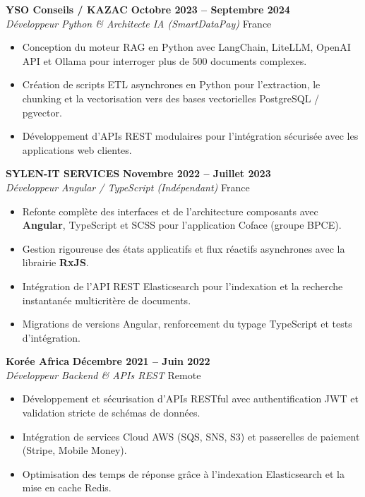 \documentclass[10pt,a4paper]{article}
\begin{document}
\vspace{0.35em}

\textbf{\large YSO Conseils / KAZAC} \hfill {\bfseries\small\color{slateGray} Octobre 2023 -- Septembre 2024} \\
\emph{\color{primary}Développeur Python \& Architecte IA (SmartDataPay)} \hfill {\small France}
\begin{itemize}[leftmargin=1.4em, itemsep=0.18em, topsep=0.15em]
    \item Conception du moteur RAG en Python avec LangChain, LiteLLM, OpenAI API et Ollama pour interroger plus de 500 documents complexes.
    \item Création de scripts ETL asynchrones en Python pour l'extraction, le chunking et la vectorisation vers des bases vectorielles PostgreSQL / pgvector.
    \item Développement d'APIs REST modulaires pour l'intégration sécurisée avec les applications web clientes.
\end{itemize}

\newpage

\textbf{\large SYLEN-IT SERVICES} \hfill {\bfseries\small\color{slateGray} Novembre 2022 -- Juillet 2023} \\
\emph{\color{primary}Développeur Angular / TypeScript (Indépendant)} \hfill {\small France}
\begin{itemize}[leftmargin=1.4em, itemsep=0.18em, topsep=0.15em]
    \item Refonte complète des interfaces et de l'architecture composants avec \textbf{Angular}, TypeScript et SCSS pour l'application Coface (groupe BPCE).
    \item Gestion rigoureuse des états applicatifs et flux réactifs asynchrones avec la librairie \textbf{RxJS}.
    \item Intégration de l'API REST Elasticsearch pour l'indexation et la recherche instantanée multicritère de documents.
    \item Migrations de versions Angular, renforcement du typage TypeScript et tests d'intégration.
\end{itemize}

\vspace{0.35em}

\textbf{\large Korée Africa} \hfill {\bfseries\small\color{slateGray} Décembre 2021 -- Juin 2022} \\
\emph{\color{primary}Développeur Backend \& APIs REST} \hfill {\small Remote}
\begin{itemize}[leftmargin=1.4em, itemsep=0.18em, topsep=0.15em]
    \item Développement et sécurisation d'APIs RESTful avec authentification JWT et validation stricte de schémas de données.
    \item Intégration de services Cloud AWS (SQS, SNS, S3) et passerelles de paiement (Stripe, Mobile Money).
    \item Optimisation des temps de réponse grâce à l'indexation Elasticsearch et la mise en cache Redis.
\end{itemize}
\end{document}
